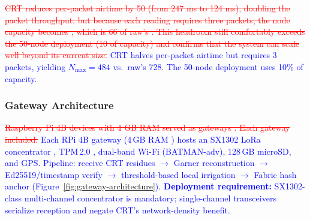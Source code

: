 \documentclass[pdflatex,sn-mathphys-num]{sn-jnl}
\theoremstyle{thmstyleone}
\theoremstyle{thmstyletwo}
\theoremstyle{thmstylethree}
\begin{document}
{\textcolor{red}{\sout{CRT reduces per‑packet airtime by 50 (from 247 ms to 124 ms), doubling the packet throughput, but because each reading requires three packets, the node capacity becomes , which is 66 of raw’s . This headroom still comfortably exceeds the 50‑node deployment (10 of capacity) and confirms that the system can scale well beyond its current size.}}
\textcolor{blue}{CRT halves per-packet airtime but requires 3 packets, yielding $N_{\max}=484$ vs.\ raw’s 728. The 50-node deployment uses 10\% of capacity.}

\subsubsection{Gateway Architecture}
\textcolor{red}{\sout{Raspberry Pi 4B devices with 4 GB RAM served as gateways . Each gateway included:}}
\textcolor{blue}{Each RPi 4B gateway (4\,GB RAM \cite{rpi2023specs}) hosts an SX1302 LoRa concentrator \cite{waveshare2024sx1302}, TPM\,2.0 \cite{microsoft2023tpm}, dual-band Wi-Fi (BATMAN-adv), 128\,GB microSD, and GPS. Pipeline: receive CRT residues $\to$ Garner reconstruction $\to$ Ed25519/timestamp verify $\to$ threshold-based local irrigation $\to$ Fabric hash anchor (Figure~\ref{fig:gateway-architecture}). \textbf{Deployment requirement:} SX1302-class multi-channel concentrator is mandatory; single-channel transceivers serialize reception and negate CRT’s network-density benefit.}

\begin{figure}
  \centering
\end{figure}}
\end{document}
